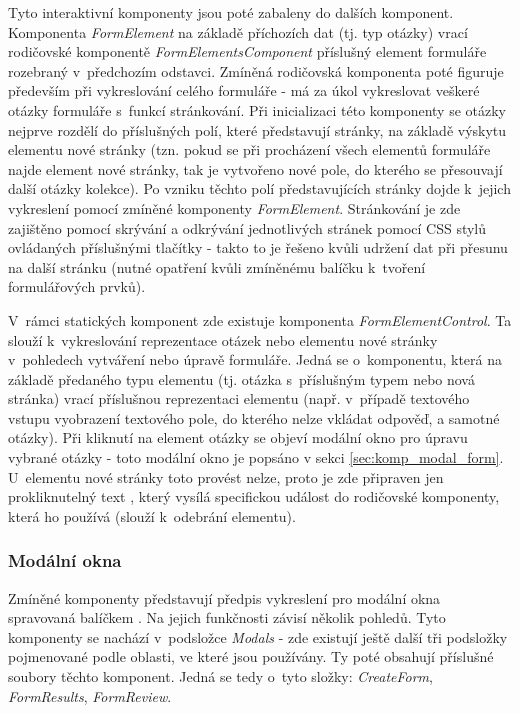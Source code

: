 		Tyto interaktivní komponenty jsou poté zabaleny do dalších komponent. Komponenta \textit{FormElement} na základě příchozích dat (tj. typ otázky) vrací rodičovské komponentě \textit{FormElementsComponent} příslušný element formuláře rozebraný v~předchozím odstavci. Zmíněná rodičovská komponenta poté figuruje především při vykreslování celého formuláře - má za úkol vykreslovat veškeré otázky formuláře s~funkcí stránkování. Při inicializaci této komponenty se otázky nejprve rozdělí do příslušných polí, které představují stránky, na základě výskytu elementu nové stránky (tzn. pokud se při procházení všech elementů formuláře najde element nové stránky, tak je vytvořeno nové pole, do kterého se přesouvají další otázky kolekce). Po vzniku těchto polí představujících stránky dojde k~jejich vykreslení pomocí zmíněné komponenty \textit{FormElement}. Stránkování je zde zajištěno pomocí skrývání a odkrývání jednotlivých stránek pomocí CSS stylů ovládaných příslušnými tlačítky - takto to je řešeno kvůli udržení dat při přesunu na další stránku (nutné opatření kvůli zmíněnému balíčku k~tvoření formulářových prvků).
		
		V~rámci statických komponent zde existuje komponenta \textit{FormElementControl}. Ta slouží k~vykreslování reprezentace otázek nebo elementu nové stránky v~pohledech vytváření nebo úpravě formuláře. Jedná se o~komponentu, která na základě předaného typu elementu (tj. otázka s~příslušným typem nebo nová stránka) vrací příslušnou reprezentaci elementu (např. v~případě textového vstupu vyobrazení textového pole, do kterého nelze vkládat odpověď, a samotné otázky). Při kliknutí na element otázky se objeví modální okno pro úpravu vybrané otázky - toto modální okno je popsáno v sekci \ref{sec:komp_modal_form}. U~elementu nové stránky toto provést nelze, proto je zde připraven jen prokliknutelný text , který vysílá specifickou událost do rodičovské komponenty, která ho používá (slouží k~odebrání elementu).
	
		\subsubsection{Modální okna} \label{sec:komp_modal} %
		Zmíněné komponenty představují předpis vykreslení pro modální okna spravovaná balíčkem . Na jejich funkčnosti závisí několik pohledů. Tyto komponenty se nachází v~podsložce \textit{Modals} - zde existují ještě další tři podsložky pojmenované podle oblasti, ve které jsou používány. Ty poté obsahují příslušné soubory těchto komponent. Jedná se tedy o~tyto složky: \textit{CreateForm}, \textit{FormResults}, \textit{FormReview}. 
		
